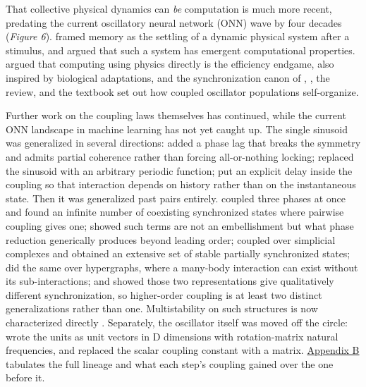 \documentclass[a4paper,fleqn]{cas-sc}
\begin{document}
That collective physical dynamics can \emph{be} computation is much more
recent, predating the current oscillatory neural network (ONN) wave by
four decades (\emph{Figure 6}). \citet{hopfield1982} framed memory as
the settling of a dynamic physical system after a stimulus, and argued
that such a system has emergent computational properties.
\citet{mead1990} argued that computing using physics directly is the
efficiency endgame, also inspired by biological adaptations, and the
synchronization canon of \citet{winfree1967}, \citet{kuramoto1975}, the
\citet{strogatz2000} review, and the \citet{pikovsky2001} textbook set
out how coupled oscillator populations self-organize.

Further work on the coupling laws themselves has continued, while the
current ONN landscape in machine learning has not yet caught up. The
single sinusoid was generalized in several directions:
\citet{sakaguchi1986} added a phase lag that breaks the symmetry and
admits partial coherence rather than forcing all-or-nothing locking;
\citet{daido1992} replaced the sinusoid with an arbitrary periodic
function; \citet{schuster1989} put an explicit delay inside the coupling
so that interaction depends on history rather than on the instantaneous
state. Then it was generalized past pairs entirely. \citet{tanaka2011}
coupled three phases at once and found an infinite number of coexisting
synchronized states where pairwise coupling gives one;
\citet{ashwin2016} showed such terms are not an embellishment but what
phase reduction generically produces beyond leading order;
\citet{skardal2019} coupled over simplicial complexes and obtained an
extensive set of stable partially synchronized states; \citet{mulas2020}
did the same over hypergraphs, where a many-body interaction can exist
without its sub-interactions; and \citet{zhang2023} showed those two
representations give qualitatively different synchronization, so
higher-order coupling is at least two distinct generalizations rather
than one. Multistability on such structures is now characterized
directly \citep{bacic2026}. Separately, the oscillator itself was moved
off the circle: \citet{chandra2019} wrote the units as unit vectors in D
dimensions with rotation-matrix natural frequencies, and
\citet{de-aguiar2023} replaced the scalar coupling constant with a
matrix. \hyperref[sec-B]{Appendix B} tabulates the full lineage and what
each step's coupling gained over the one before it.
\end{document}
